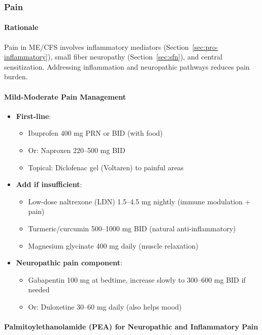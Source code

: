 \subsubsection{Pain}

\paragraph{Rationale}
Pain in ME/CFS involves inflammatory mediators (Section~\ref{sec:pro-inflammatory}), small fiber neuropathy (Section~\ref{sec:sfn}), and central sensitization. Addressing inflammation and neuropathic pathways reduces pain burden.

\paragraph{Mild-Moderate Pain Management}
\begin{itemize}
    \item \textbf{First-line}:
    \begin{itemize}
        \item Ibuprofen 400 mg PRN or BID (with food)
        \item Or: Naproxen 220--500 mg BID
        \item Topical: Diclofenac gel (Voltaren) to painful areas
    \end{itemize}

    \item \textbf{Add if insufficient}:
    \begin{itemize}
        \item Low-dose naltrexone (LDN) 1.5--4.5 mg nightly (immune modulation + pain)
        \item Turmeric/curcumin 500--1000 mg BID (natural anti-inflammatory)
        \item Magnesium glycinate 400 mg daily (muscle relaxation)
    \end{itemize}

    \item \textbf{Neuropathic pain component}:
    \begin{itemize}
        \item Gabapentin 100 mg at bedtime, increase slowly to 300--600 mg BID if needed
        \item Or: Duloxetine 30--60 mg daily (also helps mood)
    \end{itemize}
\end{itemize}

\paragraph{Palmitoylethanolamide (PEA) for Neuropathic and Inflammatory Pain}

